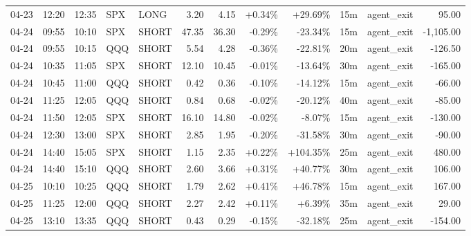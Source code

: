 \documentclass[11pt,a4paper]{article}
\begin{document}
\begin{center}
\begin{longtable}{>{\color{txtmain}}l l l l l r r r r r >{\color{txtmain}}l r}
04-23 & 12:20 & 12:35 & SPX & LONG & 3.20 & 4.15 & \textcolor{wingreen}{+0.34\%} & \textcolor{wingreen}{+29.69\%} & 15m & agent\_exit & \textcolor{wingreen}{95.00} \\
04-24 & 09:55 & 10:10 & SPX & SHORT & 47.35 & 36.30 & \textcolor{lossred}{-0.29\%} & \textcolor{lossred}{-23.34\%} & 15m & agent\_exit & \textcolor{lossred}{-1,105.00} \\
04-24 & 09:55 & 10:15 & QQQ & SHORT & 5.54 & 4.28 & \textcolor{lossred}{-0.36\%} & \textcolor{lossred}{-22.81\%} & 20m & agent\_exit & \textcolor{lossred}{-126.50} \\
04-24 & 10:35 & 11:05 & SPX & SHORT & 12.10 & 10.45 & \textcolor{lossred}{-0.01\%} & \textcolor{lossred}{-13.64\%} & 30m & agent\_exit & \textcolor{lossred}{-165.00} \\
04-24 & 10:45 & 11:00 & QQQ & SHORT & 0.42 & 0.36 & \textcolor{lossred}{-0.10\%} & \textcolor{lossred}{-14.12\%} & 15m & agent\_exit & \textcolor{lossred}{-66.00} \\
04-24 & 11:25 & 12:05 & QQQ & SHORT & 0.84 & 0.68 & \textcolor{lossred}{-0.02\%} & \textcolor{lossred}{-20.12\%} & 40m & agent\_exit & \textcolor{lossred}{-85.00} \\
04-24 & 11:50 & 12:05 & SPX & SHORT & 16.10 & 14.80 & \textcolor{lossred}{-0.02\%} & \textcolor{lossred}{-8.07\%} & 15m & agent\_exit & \textcolor{lossred}{-130.00} \\
04-24 & 12:30 & 13:00 & SPX & SHORT & 2.85 & 1.95 & \textcolor{lossred}{-0.20\%} & \textcolor{lossred}{-31.58\%} & 30m & agent\_exit & \textcolor{lossred}{-90.00} \\
04-24 & 14:40 & 15:05 & SPX & SHORT & 1.15 & 2.35 & \textcolor{wingreen}{+0.22\%} & \textcolor{wingreen}{+104.35\%} & 25m & agent\_exit & \textcolor{wingreen}{480.00} \\
04-24 & 14:40 & 15:10 & QQQ & SHORT & 2.60 & 3.66 & \textcolor{wingreen}{+0.31\%} & \textcolor{wingreen}{+40.77\%} & 30m & agent\_exit & \textcolor{wingreen}{106.00} \\
04-25 & 10:10 & 10:25 & QQQ & SHORT & 1.79 & 2.62 & \textcolor{wingreen}{+0.41\%} & \textcolor{wingreen}{+46.78\%} & 15m & agent\_exit & \textcolor{wingreen}{167.00} \\
04-25 & 11:25 & 12:00 & QQQ & SHORT & 2.27 & 2.42 & \textcolor{wingreen}{+0.11\%} & \textcolor{wingreen}{+6.39\%} & 35m & agent\_exit & \textcolor{wingreen}{29.00} \\
04-25 & 13:10 & 13:35 & QQQ & SHORT & 0.43 & 0.29 & \textcolor{lossred}{-0.15\%} & \textcolor{lossred}{-32.18\%} & 25m & agent\_exit & \textcolor{lossred}{-154.00} \\

\end{longtable}
\end{center}
\end{document}
